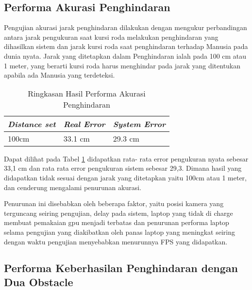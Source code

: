 \subsection{Performa Akurasi Penghindaran}
Pengujian akurasi jarak penghindaran dilakukan dengan mengukur perbandingan antara jarak pengukuran saat kursi roda melakukan penghindaran yang dihasilkan sistem dan jarak kursi roda saat penghindaran terhadap Manusia pada dunia nyata. Jarak yang ditetapkan dalam Penghindaran ialah pada 100 cm atau 1 meter, yang berarti kursi roda harus menghindar pada jarak yang ditentukan apabila ada Manusia yang terdeteksi. 

\begin{table}[H]
    \centering
    \caption{Ringkasan Hasil Performa Akurasi Penghindaran}
    \label{tb:agungkeren}
    \begin{tabular}{|l|l|l|}
    \hline
    \textit{Distance set} & \textit{Real Error} & \textit{System Error} \\ \hline
    100cm & 33.1 cm & 29.3 cm\\ \hline
    \end{tabular}
\end{table}

Dapat dilihat pada Tabel \ref{tb:agungkeren} didapatkan rata- rata error pengukuran nyata sebesar 33,1 cm dan rata rata error pengukuran sistem sebesar 29,3. Dimana hasil yang didapatkan tidak sesuai dengan jarak yang ditetapkan yaitu 100cm atau 1 meter, dan cenderung mengalami penurunan akurasi.

Penurunan ini disebabkan oleh beberapa faktor, yaitu posisi kamera yang terguncang seiring pengujian, delay pada sistem, laptop yang tidak di charge membuat pemakaian gpu menjadi terbatas dan penurunan performa laptop selama pengujian yang diakibatkan oleh panas laptop yang meningkat seiring dengan waktu pengujian menyebabkan menurunnya FPS yang didapatkan.

\subsection{Performa Keberhasilan Penghindaran dengan Dua Obstacle}

